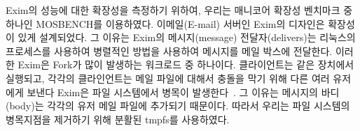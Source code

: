Exim의 성능에 대한 확장성을 측정하기 위하여, 우리는 매니코어 확장성 벤치마크 중 하나인
 MOSBENCH를 이용하였다. 
이메일(E-mail) 서버인 Exim의 디자인은 확장성이 있게 설계되었다. 그 이유는 Exim의 메시지(message)
전달자(delivers)는 리눅스의 프로세스를 사용하여 병렬적인 방법을 사용하여 메시지를 메일 박스에 전달한다. 
이러한 Exim은 Fork가 많이 발생하는 워크로드 중 하나이다. 
클라이언트는 같은 장치에서 실행되고, 각각의 클라인언트는 메일 파일에 대해서 충돌을 막기 위해
 다른 여러 유저에게 보낸다 
Exim은 파일 시스템에서 병목이 발생한다~\cite{SilasBoydWickizer2010LinuxScales48}.
그 이유는 메시지의 바디(body)는 각각의 유저 메일 파일에 추가되기 때문이다.
따라서 우리는 파일 시스템의 병목지점을 제거하기 위해 분활된 tmpfs를 사용하였다. 

